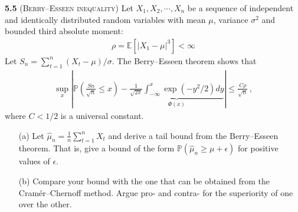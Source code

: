 












\noindent\textbf{5.5}
\textsc{(Berry–Esseen inequality)} Let $X_1,X_2,\cdots,X_n$ be a sequence of independent and identically distributed random variables with mean $\mu$, variance $\sigma^2$ and bounded third absolute moment:
\begin{align*}
    \rho=\mathbb{E}[|X_1-\mu|^3]<\infty
\end{align*}
Let $S_n=\sum^n_{t=1}(X_t-\mu)/\sigma$. The Berry–Esseen theorem shows that
\begin{align*}
    \sup_x\left|\mathbb{P}\left(\frac{Sn}{\sqrt{n}}\leq x \right)-\underbrace{\frac{1}{\sqrt{2\pi}}\int^x_{-\infty}\exp(-y^2/2)dy}_{\Phi(x)} \right|\leq\frac{C\rho}{\sqrt{n}}\,,
\end{align*}
where $C<1/2$ is a universal constant.
\begin{enumerate}
	\item[(a)] Let $\hat{\mu}_n=\frac{1}{n}\sum^n_{t=1}X_t$ and derive a tail bound from the Berry–Esseen theorem. That is, give a bound of the form $\mathbb{P}(\hat{\mu}_n\geq\mu+\epsilon)$ for positive values of $\epsilon$.
	\item[(b)] Compare your bound with the one that can be obtained from the Cram{\'e}r–Chernoff method. Argue pro- and contra- for the superiority of one over the other.
\end{enumerate}

